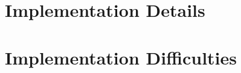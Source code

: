 \documentclass[12pt]{article}
\begin{document}
\maketitle

\section{Implementation Details}

\section{Implementation Difficulties}
\end{document}

